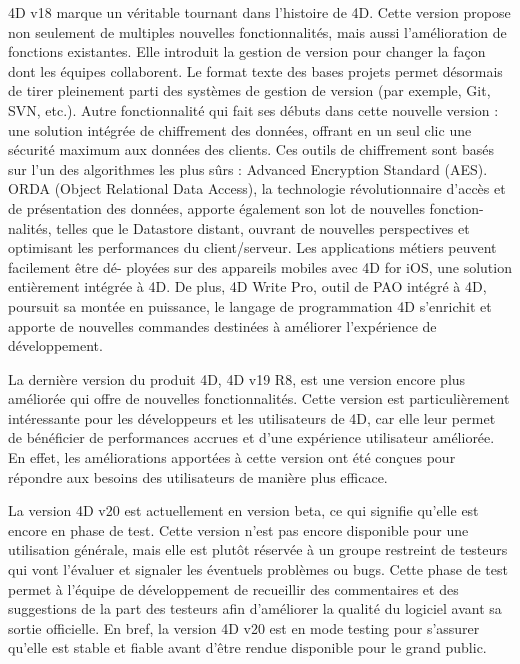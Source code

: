 \vspace{6cm}
4D v18 marque un véritable tournant dans l’histoire de 4D. Cette version propose non seulement de
multiples nouvelles fonctionnalités, mais aussi l’amélioration de fonctions existantes. Elle introduit la gestion de version pour changer 
la façon dont les équipes collaborent. Le format texte des bases projets permet désormais de tirer pleinement parti des systèmes de gestion de version
(par exemple, Git, SVN, etc.). Autre fonctionnalité qui fait ses débuts dans cette nouvelle version : une solution intégrée de chiffrement des données, 
offrant en un seul clic une sécurité maximum aux données des clients. Ces outils de chiffrement sont basés sur l’un des algorithmes les plus sûrs : 
Advanced Encryption Standard (AES). ORDA (Object Relational Data Access), la technologie révolutionnaire d’accès et de présentation 
des données, apporte également son lot de nouvelles fonction- nalités, telles que le Datastore distant, ouvrant de nouvelles perspectives et optimisant les 
performances du client/serveur. Les applications métiers peuvent facilement être dé- ployées sur des appareils mobiles avec 4D for iOS, une solution 
entièrement intégrée à 4D. De plus, 4D Write Pro, outil de PAO intégré à 4D, poursuit sa montée en puissance, le langage de programmation 4D s’enrichit et apporte de nouvelles commandes destinées à améliorer l’expérience de développement.
\newline

La dernière version du produit 4D, 4D v19 R8, est une version encore plus améliorée qui offre de nouvelles 
fonctionnalités. Cette version est particulièrement intéressante pour les développeurs et les utilisateurs de 4D,
car elle leur permet de bénéficier de performances accrues et d’une expérience utilisateur améliorée.
En effet, les améliorations apportées à cette version ont été conçues pour répondre aux besoins des utilisateurs de manière plus eﬀicace.
\newline

La version 4D v20 est actuellement en version beta, ce qui signifie 
qu’elle est encore en phase de test. Cette version n’est pas encore 
disponible pour une utilisation générale, mais elle est plutôt réservée 
à un groupe restreint de testeurs qui vont l’évaluer et signaler 
les éventuels problèmes ou bugs. Cette phase de test permet à l’équipe 
de développement de recueillir des commentaires et des suggestions de la part 
des testeurs afin d’améliorer la qualité du logiciel avant sa sortie oﬀicielle. 
En bref, la version 4D v20 est en mode testing pour s’assurer qu’elle est stable et 
fiable avant d’être rendue disponible pour le grand public.

